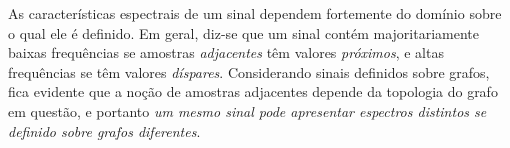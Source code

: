 As caracter\'isticas espectrais de um sinal dependem fortemente do dom\'inio sobre o qual ele \'e definido. %
Em geral, diz-se que um sinal cont\'em majoritariamente baixas frequ\^encias se amostras \emph{adjacentes} t\^em valores \emph{pr\'oximos}, e altas frequ\^encias se t\^em valores \emph{d\'ispares}. Considerando sinais definidos sobre grafos, fica evidente que a no\c c\~ao de amostras adjacentes depende da topologia do grafo em quest\~ao, e portanto \emph{um mesmo sinal pode apresentar espectros distintos se definido sobre grafos diferentes}. 

